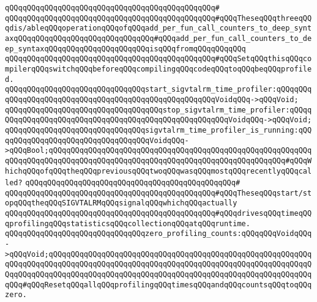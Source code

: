 \verb|qQQqqQQqqQQqqQQqqQQqqQQqqQQqqQQqqQQqqQQqqQQqqQQq#|\newline
\verb|qQQqqQQqqQQqqQQqqQQqqQQqqQQqqQQqqQQqqQQqqQQqqQQq#qQQqTheseqQQqthreeqQQqdis/ableqQQqoperationqQQqofqQQqadd_per_fun_call_counters_to_deep_syntaxqQQqqQQqqQQqqQQqqQQqqQQqqQQqqQQq#qQQqadd_per_fun_call_counters_to_deep_syntaxqQQqqQQqqQQqqQQqqQQqqQQqisqQQqfromqQQqqQQqqQQq|\newline
\verb|qQQqqQQqqQQqqQQqqQQqqQQqqQQqqQQqqQQqqQQqqQQqqQQq#qQQqSetqQQqthisqQQqcompilerqQQqswitchqQQqbeforeqQQqcompilingqQQqcodeqQQqtoqQQqbeqQQqprofiled.|\newline
\newline
\newline
\verb|qQQqqQQqqQQqqQQqqQQqqQQqqQQqqQQqstart_sigvtalrm_time_profiler:qQQqqQQqqQQqqQQqqQQqqQQqqQQqqQQqqQQqqQQqqQQqqQQqqQQqqQQqVoidqQQq->qQQqVoid;|\newline
\verb|qQQqqQQqqQQqqQQqqQQqqQQqqQQqqQQqqQQqstop_sigvtalrm_time_profiler:qQQqqQQqqQQqqQQqqQQqqQQqqQQqqQQqqQQqqQQqqQQqqQQqqQQqqQQqVoidqQQq->qQQqVoid;|\newline
\verb|qQQqqQQqqQQqqQQqqQQqqQQqqQQqqQQqsigvtalrm_time_profiler_is_running:qQQqqQQqqQQqqQQqqQQqqQQqqQQqqQQqqQQqVoidqQQq->qQQqBool;qQQqqQQqqQQqqQQqqQQqqQQqqQQqqQQqqQQqqQQqqQQqqQQqqQQqqQQqqQQqqQQqqQQqqQQqqQQqqQQqqQQqqQQqqQQqqQQqqQQqqQQqqQQqqQQqqQQqqQQqqQQq#qQQqWhichqQQqofqQQqtheqQQqpreviousqQQqtwoqQQqwasqQQqmostqQQqrecentlyqQQqcalled?|\newline
\verb|qQQqqQQqqQQqqQQqqQQqqQQqqQQqqQQqqQQqqQQqqQQqqQQq#|\newline
\verb|qQQqqQQqqQQqqQQqqQQqqQQqqQQqqQQqqQQqqQQqqQQqqQQq#qQQqTheseqQQqstart/stopqQQqtheqQQqSIGVTALRMqQQqsignalqQQqwhichqQQqactually|\newline
\verb|qQQqqQQqqQQqqQQqqQQqqQQqqQQqqQQqqQQqqQQqqQQqqQQq#qQQqdrivesqQQqtimeqQQqprofilingqQQqstatisticsqQQqcollectionqQQqatqQQqruntime.|\newline
\newline
\verb|qQQqqQQqqQQqqQQqqQQqqQQqqQQqqQQqzero_profiling_counts:qQQqqQQqVoidqQQq->qQQqVoid;qQQqqQQqqQQqqQQqqQQqqQQqqQQqqQQqqQQqqQQqqQQqqQQqqQQqqQQqqQQqqQQqqQQqqQQqqQQqqQQqqQQqqQQqqQQqqQQqqQQqqQQqqQQqqQQqqQQqqQQqqQQqqQQqqQQqqQQqqQQqqQQqqQQqqQQqqQQqqQQqqQQqqQQqqQQqqQQqqQQqqQQqqQQqqQQqqQQqqQQqqQQq#qQQqResetqQQqallqQQqprofilingqQQqtimesqQQqandqQQqcountsqQQqtoqQQqzero.|\newline
